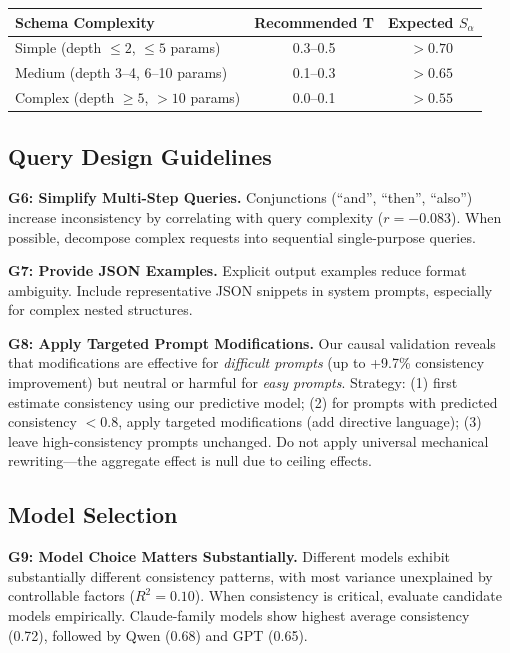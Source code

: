 \documentclass[sigconf,anonymous,review]{acmart}
\begin{document}
\begin{center}
\small
\begin{tabular}{@{}lcc@{}}
\toprule
\textbf{Schema Complexity} & \textbf{Recommended T} & \textbf{Expected $S_\alpha$} \\
\midrule
Simple (depth $\leq 2$, $\leq 5$ params) & 0.3--0.5 & $>0.70$ \\
Medium (depth 3--4, 6--10 params) & 0.1--0.3 & $>0.65$ \\
Complex (depth $\geq 5$, $>10$ params) & 0.0--0.1 & $>0.55$ \\
\bottomrule
\end{tabular}
\end{center}

\subsection{Query Design Guidelines}

\textbf{G6: Simplify Multi-Step Queries.} Conjunctions (``and'', ``then'', ``also'') increase inconsistency by correlating with query complexity ($r = -0.083$). When possible, decompose complex requests into sequential single-purpose queries.

\textbf{G7: Provide JSON Examples.} Explicit output examples reduce format ambiguity. Include representative JSON snippets in system prompts, especially for complex nested structures.

\textbf{G8: Apply Targeted Prompt Modifications.} Our causal validation reveals that modifications are effective for \textit{difficult prompts} (up to +9.7\% consistency improvement) but neutral or harmful for \textit{easy prompts}. Strategy: (1) first estimate consistency using our predictive model; (2) for prompts with predicted consistency $<0.8$, apply targeted modifications (add directive language); (3) leave high-consistency prompts unchanged. Do not apply universal mechanical rewriting---the aggregate effect is null due to ceiling effects.

\subsection{Model Selection}

\textbf{G9: Model Choice Matters Substantially.} Different models exhibit substantially different consistency patterns, with most variance unexplained by controllable factors ($R^2=0.10$). When consistency is critical, evaluate candidate models empirically. Claude-family models show highest average consistency (0.72), followed by Qwen (0.68) and GPT (0.65).
\end{document}
